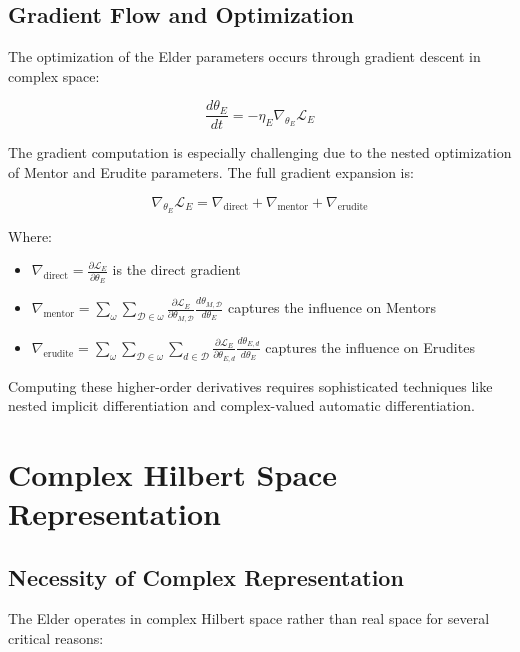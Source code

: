 \subsection{Gradient Flow and Optimization}

The optimization of the Elder parameters occurs through gradient descent in complex space:

\begin{equation}
\frac{d\theta_E}{dt} = -\eta_E \nabla_{\theta_E} \mathcal{L}_E
\end{equation}

The gradient computation is especially challenging due to the nested optimization of Mentor and Erudite parameters. The full gradient expansion is:

\begin{equation}
\nabla_{\theta_E} \mathcal{L}_E = \nabla_{\text{direct}} + \nabla_{\text{mentor}} + \nabla_{\text{erudite}}
\end{equation}

Where:
\begin{itemize}
\item $\nabla_{\text{direct}} = \frac{\partial \mathcal{L}_E}{\partial \theta_E}$ is the direct gradient
\item $\nabla_{\text{mentor}} = \sum_{\omega} \sum_{\mathcal{D} \in \omega} \frac{\partial \mathcal{L}_E}{\partial \theta_{M,\mathcal{D}}} \frac{d\theta_{M,\mathcal{D}}}{d\theta_E}$ captures the influence on Mentors
\item $\nabla_{\text{erudite}} = \sum_{\omega} \sum_{\mathcal{D} \in \omega} \sum_{d \in \mathcal{D}} \frac{\partial \mathcal{L}_E}{\partial \theta_{E,d}} \frac{d\theta_{E,d}}{d\theta_E}$ captures the influence on Erudites
\end{itemize}

Computing these higher-order derivatives requires sophisticated techniques like nested implicit differentiation and complex-valued automatic differentiation.

\section{Complex Hilbert Space Representation}

\subsection{Necessity of Complex Representation}

The Elder operates in complex Hilbert space rather than real space for several critical reasons:

